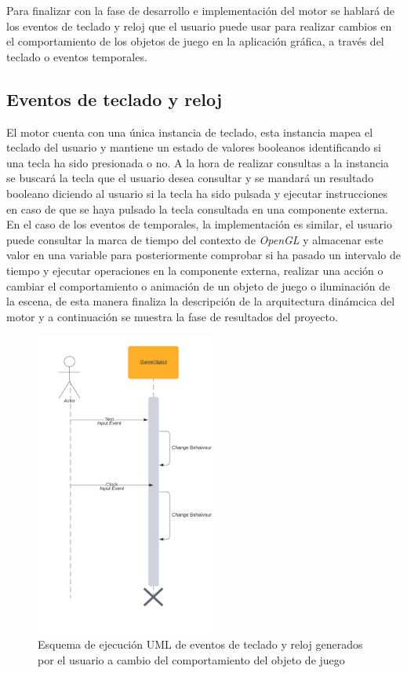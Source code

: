 \documentclass[a4paper]{book}
\begin{document}
Para finalizar con la fase de desarrollo e implementación del motor se hablará de los eventos de
teclado y reloj que el usuario puede usar para realizar cambios en el comportamiento de los objetos de juego en la aplicación gráfica, 
a través del teclado o eventos temporales.

\subsection{Eventos de teclado y reloj}
\label{subsec:eventos}

El motor cuenta con una única instancia de teclado, esta instancia mapea el teclado del usuario y mantiene un estado de valores
booleanos identificando si una tecla ha sido presionada o no. A la hora de realizar consultas a la instancia se buscará la tecla
que el usuario desea consultar y se mandará un resultado booleano diciendo al usuario si la tecla ha sido pulsada y ejecutar
instrucciones en caso de que se haya pulsado la tecla consultada en una componente externa. En el caso de los eventos de temporales,
la implementación es similar, el usuario puede consultar la marca de tiempo del contexto de \textit{OpenGL} y almacenar este valor
en una variable para posteriormente comprobar si ha pasado un intervalo de tiempo y ejecutar operaciones en la componente externa,
realizar una acción o cambiar el comportamiento o animación de un objeto de juego o iluminación de la escena, de esta manera finaliza 
la descripción de la arquitectura dinámcica del motor y a continuación se muestra la fase de resultados del proyecto.

\begin{figure}[H]
    \centering
    \includegraphics[width=6cm, keepaspectratio]{img/UserEvent.png}
    \caption{Esquema de ejecución UML de eventos de teclado y reloj generados por el usuario a cambio del comportamiento del objeto de juego}
    \label{UserEvent}
\end{figure}
\end{document}
